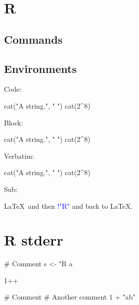 \documentclass[11pt]{article}
\begin{document}
\section*{R}

\subsection*{Commands}




\printpythontex




\subsection*{Environments}

Code:
\begin{Rcode}
cat("A string.", " ")
cat(2^8)
\end{Rcode}

Block:
\begin{Rblock}
cat("A string.", " ")
cat(2^8)
\end{Rblock}

\printpythontex

Verbatim:
\begin{Rverbatim}
cat("A string.", " ")
cat(2^8)
\end{Rverbatim}

Sub:
\begin{Rsub}
\LaTeX\ and then \textcolor{blue}{!{"R"}} and back to \LaTeX.
\end{Rsub}


\section*{R stderr}


\begin{Rblock}[err1][numbers=left]
# Comment
s <- "R a
\end{Rblock}

\stderrpythontex[][breaklines, breakafter=\\/]

\begin{Rblock}[err2][numbers=left]
1++
\end{Rblock}

\stderrpythontex[][breaklines, breakafter=\\/]

\begin{Rblock}[err3][numbers=left]
# Comment
# Another comment
1 + "ab"
\end{Rblock}

\stderrpythontex[][breaklines, breakafter=\\/]
\end{document}
